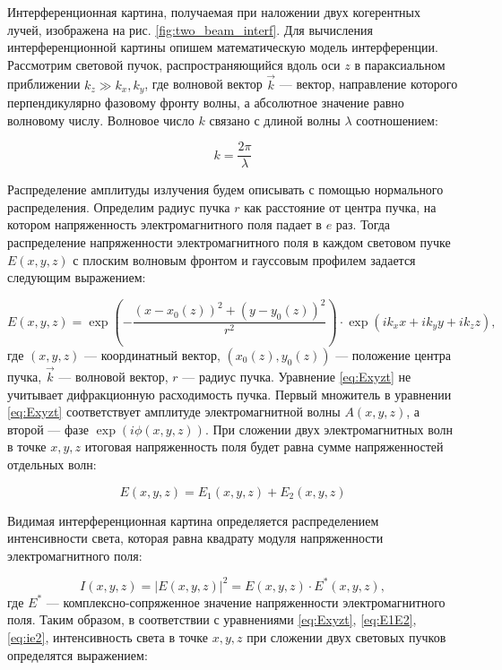 Интерференционная картина, получаемая при наложении двух когерентных лучей, изображена на рис. \ref{fig:two_beam_interf}. Для вычисления интерференционной картины опишем математическую модель интерференции. Рассмотрим световой пучок, распространяющийся вдоль оси $z$ в параксиальном приближении $k_z \gg k_x, k_y$, где волновой вектор $\vec{k}$ --- вектор, направление которого перпендикулярно фазовому фронту волны, а абсолютное значение равно волновому числу. Волновое число $k$ связано с длиной волны $\lambda$ соотношением:

\begin{equation*}
    k = \frac{2\pi}{\lambda}
\end{equation*}

Распределение амплитуды излучения будем описывать с помощью нормального распределения. Определим радиус пучка $r$ как расстояние от центра пучка, на котором напряженность электромагнитного поля падает в $e$ раз. 
Тогда распределение напряженности электромагнитного поля в каждом световом пучке $E(x, y, z)$ с плоским волновым фронтом и гауссовым профилем задается следующим выражением: 

\begin{equation}
    E(x,y,z) = \exp \left(-\frac{(x-x_0(z))^2+(y-y_0(z))^2}{r^2} \right) \cdot \exp \left(i k_xx+ik_yy+ik_zz\right),
\label{eq:Exyzt}
\end{equation}
где $(x,y,z)$ --- координатный вектор, $(x_0(z),y_0(z))$ --- положение центра пучка, $\vec{k}$ --- волновой вектор, $r$ --- радиус пучка. Уравнение \eqref{eq:Exyzt} не учитывает дифракционную расходимость пучка. 
Первый множитель в уравнении \eqref{eq:Exyzt} соответствует амплитуде электромагнитной волны $A(x,y,z)$, а второй --- фазе $\exp(i\phi(x,y,z))$. 
При сложении двух электромагнитных волн в точке $x, y, z$ итоговая напряженность поля будет равна сумме напряженностей отдельных волн: 

\begin{equation}
    E(x, y, z) = E_1(x, y, z) + E_2(x, y, z)
\label{eq:E1E2}
\end{equation}

Видимая интерференционная картина определяется распределением интенсивности света, которая равна квадрату модуля напряженности электромагнитного поля: 

\begin{equation}
    I(x, y, z) = |E(x, y, z)|^2 = E(x,y,z) \cdot E^*(x,y,z),
\label{eq:ie2}
\end{equation}
где $E^*$ --- комплексно-сопряженное значение напряженности электромагнитного поля. Таким образом, в соответствии с уравнениями \eqref{eq:Exyzt}, \eqref{eq:E1E2}, \eqref{eq:ie2}, интенсивность света в точке $x, y, z$ при сложении двух световых пучков определятся выражением: 

